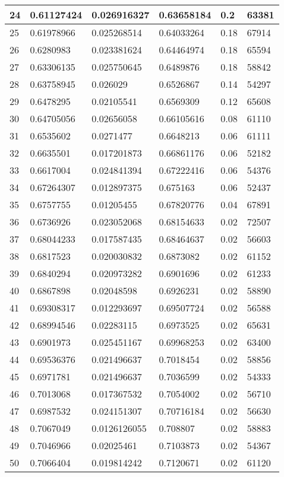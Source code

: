 \begin{longtable}{|l|l|l|l|l|l|}
24 & 0.61127424 & 0.026916327 & 0.63658184 & 0.2 & 63381 \\ \hline 
25 & 0.61978966 & 0.025268514 & 0.64033264 & 0.18 & 67914 \\ \hline 
26 & 0.6280983 & 0.023381624 & 0.64464974 & 0.18 & 65594 \\ \hline 
27 & 0.63306135 & 0.025750645 & 0.6489876 & 0.18 & 58842 \\ \hline 
28 & 0.63758945 & 0.026029 & 0.6526867 & 0.14 & 54297 \\ \hline 
29 & 0.6478295 & 0.02105541 & 0.6569309 & 0.12 & 65608 \\ \hline 
30 & 0.64705056 & 0.02656058 & 0.66105616 & 0.08 & 61110 \\ \hline 
31 & 0.6535602 & 0.0271477 & 0.6648213 & 0.06 & 61111 \\ \hline 
32 & 0.6635501 & 0.017201873 & 0.66861176 & 0.06 & 52182 \\ \hline 
33 & 0.6617004 & 0.024841394 & 0.67222416 & 0.06 & 54376 \\ \hline 
34 & 0.67264307 & 0.012897375 & 0.675163 & 0.06 & 52437 \\ \hline 
35 & 0.6757755 & 0.01205455 & 0.67820776 & 0.04 & 67891 \\ \hline 
36 & 0.6736926 & 0.023052068 & 0.68154633 & 0.02 & 72507 \\ \hline 
37 & 0.68044233 & 0.017587435 & 0.68464637 & 0.02 & 56603 \\ \hline 
38 & 0.6817523 & 0.020030832 & 0.6873082 & 0.02 & 61152 \\ \hline 
39 & 0.6840294 & 0.020973282 & 0.6901696 & 0.02 & 61233 \\ \hline 
40 & 0.6867898 & 0.02048598 & 0.6926231 & 0.02 & 58890 \\ \hline 
41 & 0.69308317 & 0.012293697 & 0.69507724 & 0.02 & 56588 \\ \hline 
42 & 0.68994546 & 0.02283115 & 0.6973525 & 0.02 & 65631 \\ \hline 
43 & 0.6901973 & 0.025451167 & 0.69968253 & 0.02 & 63400 \\ \hline 
44 & 0.69536376 & 0.021496637 & 0.7018454 & 0.02 & 58856 \\ \hline 
45 & 0.6971781 & 0.021496637 & 0.7036599 & 0.02 & 54333 \\ \hline 
46 & 0.7013068 & 0.017367532 & 0.7054002 & 0.02 & 56710 \\ \hline 
47 & 0.6987532 & 0.024151307 & 0.70716184 & 0.02 & 56630 \\ \hline 
48 & 0.7067049 & 0.0126126055 & 0.708807 & 0.02 & 58883 \\ \hline 
49 & 0.7046966 & 0.02025461 & 0.7103873 & 0.02 & 54367 \\ \hline 
50 & 0.7066404 & 0.019814242 & 0.7120671 & 0.02 & 61120 \\ \hline 
\end{longtable}